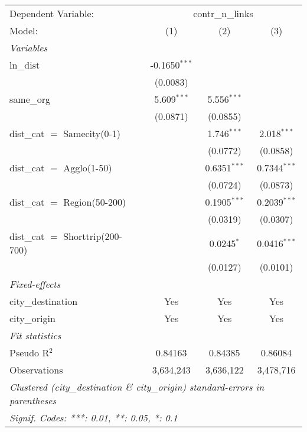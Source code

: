 \begingroup
\centering
\begin{tabular}{lccc}
   \tabularnewline \midrule \midrule
   Dependent Variable: & \multicolumn{3}{c}{contr\_n\_links}\\
   Model:                            & (1)             & (2)            & (3)\\  
   \midrule
   \emph{Variables}\\
   ln\_dist                          & -0.1650$^{***}$ &                &   \\   
                                     & (0.0083)        &                &   \\   
   same\_org                         & 5.609$^{***}$   & 5.556$^{***}$  &   \\   
                                     & (0.0871)        & (0.0855)       &   \\   
   dist\_cat $=$ Samecity(0-1)       &                 & 1.746$^{***}$  & 2.018$^{***}$\\   
                                     &                 & (0.0772)       & (0.0858)\\   
   dist\_cat $=$ Agglo(1-50)         &                 & 0.6351$^{***}$ & 0.7344$^{***}$\\   
                                     &                 & (0.0724)       & (0.0873)\\   
   dist\_cat $=$ Region(50-200)      &                 & 0.1905$^{***}$ & 0.2039$^{***}$\\   
                                     &                 & (0.0319)       & (0.0307)\\   
   dist\_cat $=$ Shorttrip(200-700)  &                 & 0.0245$^{*}$   & 0.0416$^{***}$\\   
                                     &                 & (0.0127)       & (0.0101)\\   
   \midrule
   \emph{Fixed-effects}\\
   city\_destination                 & Yes             & Yes            & Yes\\  
   city\_origin                      & Yes             & Yes            & Yes\\  
   \midrule
   \emph{Fit statistics}\\
   Pseudo R$^2$                      & 0.84163         & 0.84385        & 0.86084\\  
   Observations                      & 3,634,243       & 3,636,122      & 3,478,716\\  
   \midrule \midrule
   \multicolumn{4}{l}{\emph{Clustered (city\_destination \& city\_origin) standard-errors in parentheses}}\\
   \multicolumn{4}{l}{\emph{Signif. Codes: ***: 0.01, **: 0.05, *: 0.1}}\\
\end{tabular}
\par\endgroup


